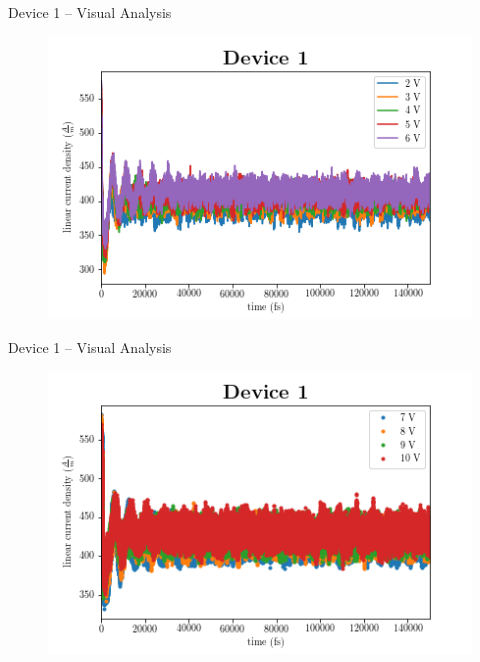 \documentclass{beamer}
\begin{document}
\begin{frame}{Device 1 -- Visual Analysis}

\begin{figure}
    \centering
    \includegraphics[scale=0.5]{Figures/Device_1/2_to_6V.png}
    \label{fig:dev_1_2}
\end{figure}

\end{frame}

\begin{frame}{Device 1 -- Visual Analysis}
\begin{figure}
    \centering
    \includegraphics[scale=0.5]{Figures/Device_1/7_to_10V.png}
    \label{fig:dev_1_3}
\end{figure}
\end{frame}
\end{document}
